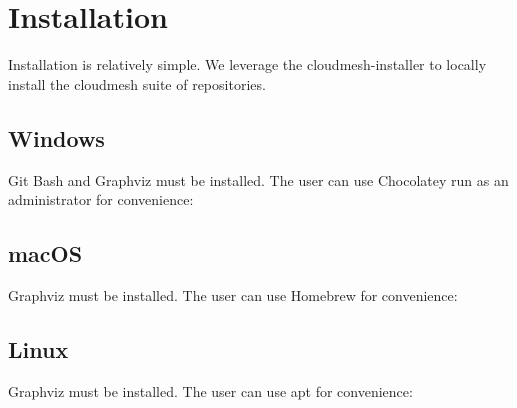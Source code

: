 \hypertarget{installation}{%
\section{Installation}\label{installation}}

Installation is relatively simple. We leverage the cloudmesh-installer
to locally install the cloudmesh suite of repositories.

\begin{Shaded}
\begin{Highlighting}[]
\end{Highlighting}
\end{Shaded}

\hypertarget{windows}{%
\subsection{Windows}\label{windows}}

Git Bash and Graphviz must be installed. The user can use Chocolatey run
as an administrator for convenience:

\begin{Shaded}
\begin{Highlighting}[]
 \DataTypeTok{\textbackslash{}}
 
\end{Highlighting}
\end{Shaded}

\hypertarget{macos}{%
\subsection{macOS}\label{macos}}

Graphviz must be installed. The user can use Homebrew for convenience:

\begin{Shaded}
\begin{Highlighting}[]
\end{Highlighting}
\end{Shaded}

\hypertarget{linux}{%
\subsection{Linux}\label{linux}}

Graphviz must be installed. The user can use apt for convenience:

\begin{Shaded}
\begin{Highlighting}[]
\end{Highlighting}
\end{Shaded}
